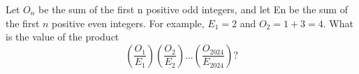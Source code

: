 Let $O_n$ be the sum of the first n positive odd integers, and let En be the sum of the first $n$ positive even integers. For example, $E_1 = 2$ and $O_2 = 1 + 3 = 4$. What is the value of the product \[(\dfrac{O_1}{E_1}) (\dfrac{O_2}{E_2}) ... (\dfrac{O_{2024}}{E_{2024}})?\]
